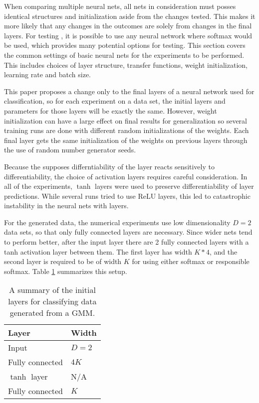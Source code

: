 \label{sect:commonLayerConfig}

When comparing multiple neural nets, all nets in consideration must posses identical structures and initialization aside from the changes tested. This makes it more likely that any changes in the outcomes are solely from changes in the final layers. For testing \RS, it is possible to use any neural network where softmax would be used, which provides many potential options for testing. This section covers the common settings of basic neural nets for the experiments to be performed. This includes choices of layer structure, transfer functions, weight initialization, learning rate and batch size.

This paper proposes a change only to the final layers of a neural network used for classification, so for each experiment on a data set, the initial layers and parameters for those layers will be exactly the same. However, weight initialization can have a large effect on final results for generalization so several training runs are done with different random initializations of the weights.  Each final layer gets the same initialization of the weights on previous layers through the use of random number generator seeds.

Because the \DR supposes differntiability of the \RS layer reacts sensitively to differentiability, the choice of activation layers requires careful consideration.  In all of the experiments, \( \tanh \) layers were used to preserve differentiability of layer predictions.  While several runs tried to use ReLU layers, this led to catastrophic instability in the neural nets with \RS layers.

For the generated data, the numerical experiments use low dimensionality \( D=2 \) data sets, so that only fully connected layers are necessary.  Since wider nets tend to perform better, after the input layer there are 2 fully connected layers with a tanh activation layer between them.  The first layer has width \( K*4 \), and the second layer is required to be of width \( K \) for using either softmax or responsible softmax.
Table \ref{table:GMMlayers} summarizes this setup.

\begin{table}[h]
	\centering
	\begin{tabular}{|l|l|}
		\toprule
		\textbf{Layer}  & \textbf{Width} \\ \midrule
		Input           & $D = 2$     \\ \midrule
		Fully connected & $4K$  \\ \midrule
		$\tanh$ layer   & N/A   \\ \midrule
		Fully connected & $K$   \\
		\bottomrule
	\end{tabular}
	\caption[General layer setup for GMM classification]{A summary of the initial layers for classifying data generated from a GMM.}\label{table:GMMlayers}
\end{table}

